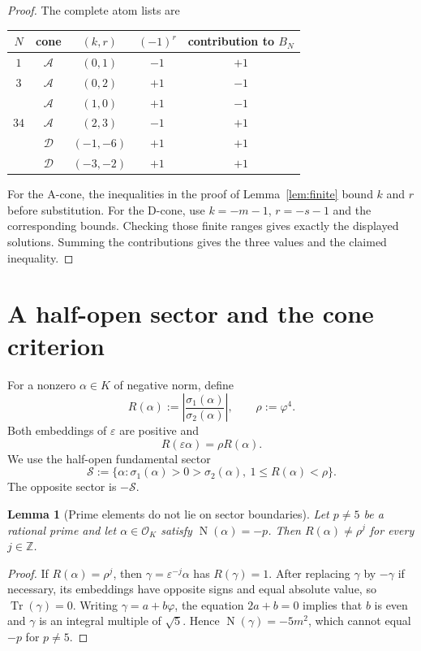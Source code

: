 \documentclass[12pt]{amsart}
\newtheorem{lemma}[theorem]{Lemma}
\theoremstyle{definition}
\theoremstyle{remark}
\DeclareMathOperator{\N}{N}
\DeclareMathOperator{\Tr}{Tr}
\newcommand{\ZZ}{\mathbb{Z}}
\newcommand{\OK}{\mathcal{O}_K}
\newcommand{\eps}{\varepsilon}
\newcommand{\ph}{\varphi}
\newcommand{\Acone}{\mathcal{A}}
\newcommand{\Dcone}{\mathcal{D}}
\newcommand{\Sector}{\mathcal{S}}
\begin{document}
\begin{proof}
The complete atom lists are
\begin{center}
\begin{tabular}{ccccc}
\toprule
$N$ & cone & $(k,r)$ & $(-1)^r$ & contribution to $B_N$\\
\midrule
$1$ & $\Acone$ & $(0,1)$ & $-1$ & $+1$\\
\midrule
$3$ & $\Acone$ & $(0,2)$ & $+1$ & $-1$\\
    & $\Acone$ & $(1,0)$ & $+1$ & $-1$\\
\midrule
$34$ & $\Acone$ & $(2,3)$ & $-1$ & $+1$\\
     & $\Dcone$ & $(-1,-6)$ & $+1$ & $+1$\\
     & $\Dcone$ & $(-3,-2)$ & $+1$ & $+1$\\
\bottomrule
\end{tabular}
\end{center}
For the A-cone, the inequalities in the proof of
Lemma~\ref{lem:finite} bound $k$ and $r$ before substitution.  For the
D-cone, use $k=-m-1$, $r=-s-1$ and the corresponding bounds.  Checking
those finite ranges gives exactly the displayed solutions.  Summing
the contributions gives the three values and the claimed inequality.
\end{proof}

\section{A half-open sector and the cone criterion}\label{sec:sectors}

For a nonzero $\alpha\in K$ of negative norm, define
\[
  R(\alpha):=\left|\frac{\sigma_1(\alpha)}{\sigma_2(\alpha)}\right|,
  \qquad
  \rho:=\ph^4.
\]
Both embeddings of $\eps$ are positive and
\[
  R(\eps\alpha)=\rho R(\alpha).
\]
We use the half-open fundamental sector
\[
  \Sector:=\{\alpha:\sigma_1(\alpha)>0>\sigma_2(\alpha),\
                  1\leq R(\alpha)<\rho\}.
\]
The opposite sector is $-\Sector$.

\begin{lemma}[Prime elements do not lie on sector boundaries]
\label{lem:no-boundary}
Let $p\neq5$ be a rational prime and let
$\alpha\in\OK$ satisfy $\N(\alpha)=-p$.  Then
$R(\alpha)\neq\rho^j$ for every $j\in\ZZ$.
\end{lemma}

\begin{proof}
If $R(\alpha)=\rho^j$, then
$\gamma=\eps^{-j}\alpha$ has $R(\gamma)=1$.  After replacing
$\gamma$ by $-\gamma$ if necessary, its embeddings have opposite signs
and equal absolute value, so $\Tr(\gamma)=0$.  Writing
$\gamma=a+b\ph$, the equation $2a+b=0$ implies that $b$ is even and
$\gamma$ is an integral multiple of $\sqrt5$.  Hence
$\N(\gamma)=-5m^2$, which cannot equal $-p$ for $p\neq5$.
\end{proof}
\end{document}
